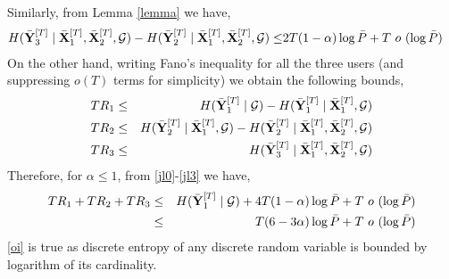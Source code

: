 \documentclass[11pt]{article}
\begin{document}
Similarly, from Lemma \ref{lemma} we have,  
\begin{align}
H(\bar{\bf Y}_3^{[T]}\mid \bar{\bf X}_1^{[T]},\bar{\bf X}_2^{[T]},\mathcal{G})-H(\bar{\bf Y}_2^{[T]}\mid \bar{\bf X}_1^{[T]},\bar{\bf X}_2^{[T]},\mathcal{G})\le&2T(1-\alpha)\log{\bar{P}}+T~o~(\log{\bar{P}})\label{jl00}
\end{align} 
On the other hand, writing Fano's inequality for all the three users (and suppressing $o(T)$ terms for simplicity) we obtain the following bounds,
\begin{eqnarray}
TR_1&\le& H(\bar{\bf Y}_{1}^{[T]}\mid \mathcal{G})- H(\bar{\bf Y}_{1}^{[T]}\mid \bar{\bf X}_{1}^{[T]},\mathcal{G})\label{jl1}\\
TR_2&\le& H(\bar{\bf Y}_{2}^{[T]}\mid \bar{\bf X}_{1}^{[T]},\mathcal{G})- H(\bar{\bf Y}_{2}^{[T]}\mid \bar{\bf X}_{1}^{[T]},\bar{\bf X}_{2}^{[T]},\mathcal{G})\label{jl2}\\
TR_3&\le& H(\bar{\bf Y}_{3}^{[T]}\mid  \bar{\bf X}_{1}^{[T]},\bar{\bf X}_{2}^{[T]},\mathcal{G})\label{jl3}
\end{eqnarray}
Therefore, for $\alpha\le1$, from \eqref{jl0}-\eqref{jl3} we have,
\begin{eqnarray}
TR_1+TR_2+TR_3&\le& H(\bar{\bf Y}_{1}^{[T]}\mid \mathcal{G})+4T(1-\alpha)\log{\bar{P}}+T~o~(\log{\bar{P}})\\
&\le&T(6-3\alpha)\log{\bar{P}}+T~o~(\log{\bar{P}})\label{oi}
\end{eqnarray}
\eqref{oi} is true as discrete entropy of any discrete random variable is bounded by logarithm of its cardinality.
\end{document}
